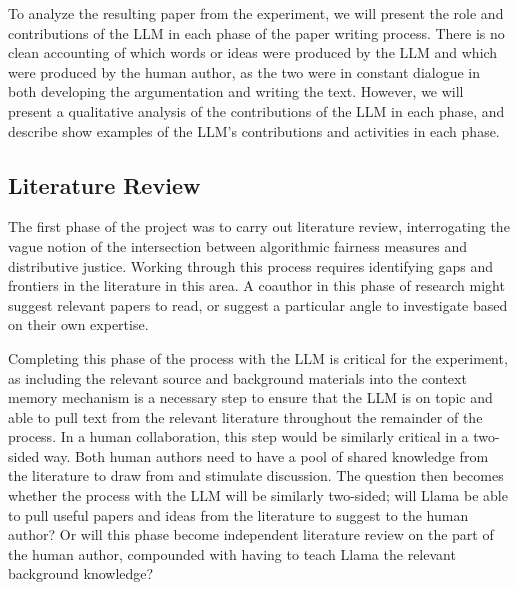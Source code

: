 To analyze the resulting paper from the experiment, we will present the role and
contributions of the LLM in each phase of the paper writing process. There is no
clean accounting of which words or ideas were produced by the LLM and which were
produced by the human author, as the two were in constant dialogue in both
developing the argumentation and writing the text. However, we will present a 
qualitative analysis of the contributions of the LLM in each phase, and describe
show examples of the LLM's contributions and activities in each phase.

\subsection{Literature Review}

The first phase of the project was to carry out literature review, interrogating
the vague notion of the intersection between algorithmic fairness measures and
distributive justice. Working through this process requires identifying gaps and
frontiers in the literature in this area. A coauthor in this phase of research
might suggest relevant papers to read, or suggest a particular angle to
investigate based on their own expertise.

Completing this phase of the process with the LLM is critical for the experiment,
as including the relevant source and background materials into the context
memory mechanism is a necessary step to ensure that the LLM is on topic and able
to pull text from the relevant literature throughout the remainder of the
process. In a human collaboration, this step would be similarly critical in a
two-sided way. Both human authors need to have a pool of shared knowledge from
the literature to draw from and stimulate discussion. The question then becomes
whether the process with the LLM will be similarly two-sided; will Llama be able
to pull useful papers and ideas from the literature to suggest to the human 
author? Or will this phase become independent literature review on the part of
the human author, compounded with having to teach Llama the relevant
background knowledge?

